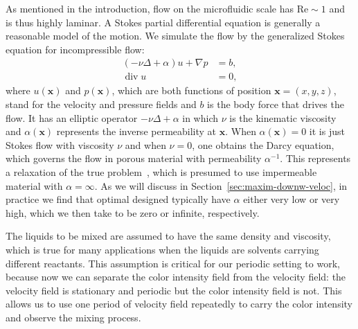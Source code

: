 \documentclass[times]{fldauth}
\begin{document}
As mentioned in the introduction, flow on the microfluidic
scale has $\text{Re}\sim 1$ and is thus highly laminar. A Stokes partial
differential equation is generally a reasonable model of the motion.
We simulate the flow by the generalized Stokes equation for
incompressible flow:
\begin{subequations}
  \label{stokes}
  \begin{align}
    \label{stokes1}
    ( -\nu\Delta + \alpha)u
    + \nabla p &= b, \\
    \label{stokes2}
    \operatorname{div} u &= 0,
  \end{align}
\end{subequations}
where $u(\mathbf{x})$ and $p(\mathbf{x})$, which are both functions of
position $\mathbf{x}=(x,y,z)$, stand for the velocity and pressure
fields and $b$ is the body force that drives the flow. It has an
elliptic operator $-\nu\Delta + \alpha $ in which $\nu$ is the
kinematic viscosity and $\alpha(\mathbf{x})$ represents the inverse
permeability at $\mathbf{x}$. When $\alpha(\mathbf{x}) = 0 $ it is
just Stokes flow with viscosity $\nu$ and when $\nu=0$, one obtains
the Darcy equation, which governs the flow in porous material with
permeability $\alpha^{-1}$. This represents a relaxation of the true
problem~\cite{Evgrafov2005, Borrvall2003}, which is presumed to use
impermeable material with $\alpha = \infty$. As we will discuss in
Section~\ref{sec:maxim-downw-veloc}, in practice we find that optimal
designed typically have $\alpha$ either very low or very high, which
we then take to be zero or infinite, respectively.

The liquids to be mixed are assumed to have the same density and
viscosity, which is true for many applications when the liquids are
solvents carrying different reactants. This assumption is critical for
our periodic setting to work, because now we can separate the color
intensity field from the velocity field: the velocity field is
stationary and periodic but the color intensity field is not. This
allows us to use one period of velocity field repeatedly to carry the
color intensity and observe the mixing process.
\end{document}

